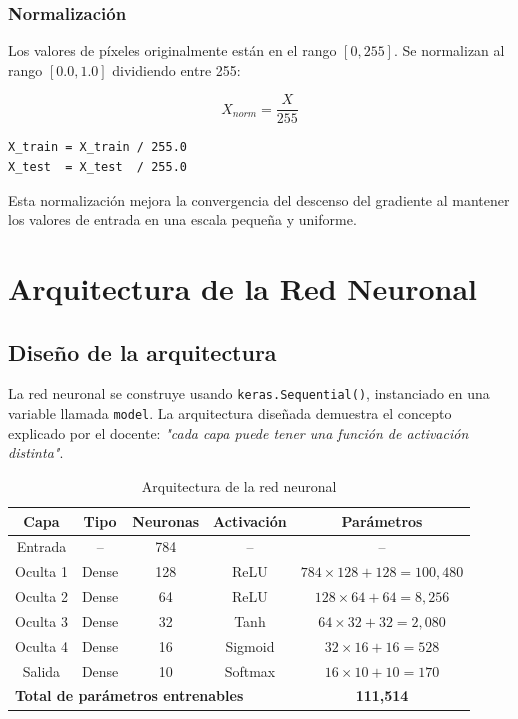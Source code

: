 \documentclass[12pt,a4paper]{article}
\begin{document}
\subsubsection{Normalización}
Los valores de píxeles originalmente están en el rango $[0, 255]$. Se normalizan al rango $[0.0, 1.0]$ dividiendo entre 255:

\begin{equation}
    X_{norm} = \frac{X}{255}
\end{equation}

\begin{lstlisting}[style=pythonstyle, caption=Normalización de píxeles]
X_train = X_train / 255.0
X_test  = X_test  / 255.0
\end{lstlisting}

Esta normalización mejora la convergencia del descenso del gradiente al mantener los valores de entrada en una escala pequeña y uniforme.

\section{Arquitectura de la Red Neuronal}

\subsection{Diseño de la arquitectura}

La red neuronal se construye usando \texttt{keras.Sequential()}, instanciado en una variable llamada \texttt{model}. La arquitectura diseñada demuestra el concepto explicado por el docente: \textit{"cada capa puede tener una función de activación distinta"}.

\begin{table}[H]
    \centering
    \begin{tabular}{@{}ccccc@{}}
        \toprule
        \textbf{Capa} & \textbf{Tipo} & \textbf{Neuronas} & \textbf{Activación} & \textbf{Parámetros} \\
        \midrule
        Entrada & -- & 784 & -- & -- \\
        Oculta 1 & Dense & 128 & ReLU & $784 \times 128 + 128 = 100,480$ \\
        Oculta 2 & Dense & 64 & ReLU & $128 \times 64 + 64 = 8,256$ \\
        Oculta 3 & Dense & 32 & Tanh & $64 \times 32 + 32 = 2,080$ \\
        Oculta 4 & Dense & 16 & Sigmoid & $32 \times 16 + 16 = 528$ \\
        Salida & Dense & 10 & Softmax & $16 \times 10 + 10 = 170$ \\
        \midrule
        \multicolumn{4}{l}{\textbf{Total de parámetros entrenables}} & \textbf{111,514} \\
        \bottomrule
    \end{tabular}
    \caption{Arquitectura de la red neuronal}
\end{table}
\end{document}
